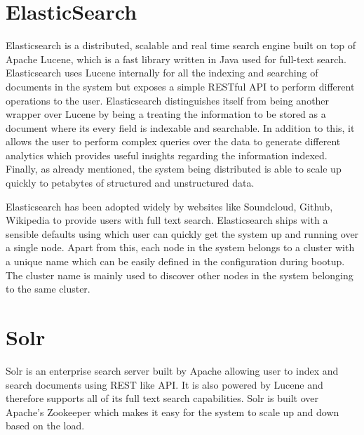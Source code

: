 \documentclass[12pt,a4paper,twoside,openright]{book}
\begin{document}
\section{ElasticSearch}

Elasticsearch \cite{elasticsearch} is a distributed, scalable and real time search engine built on top of Apache Lucene, which is a fast library written in Java used for full-text search. Elasticsearch uses Lucene internally for all the indexing and searching of documents in the system but exposes a simple RESTful API to perform different operations to the user. Elasticsearch distinguishes itself from being another wrapper over Lucene by being a treating the information to be stored as a document where its every field is indexable and searchable. In addition to this, it allows the user to perform complex queries over the data to generate different analytics which provides useful insights regarding the information indexed. Finally, as already mentioned, the system being distributed is able to scale up quickly to petabytes of structured and unstructured data.

\par Elasticsearch has been adopted widely by websites like Soundcloud, Github, Wikipedia to provide users with full text search. Elasticsearch ships with a sensible defaults using which user can quickly get the system up and running over a single node. Apart from this, each node in the system belongs to a cluster with a unique name which can be easily defined in the configuration during bootup. The cluster name is mainly used to discover other nodes in the system belonging to the same cluster.

\section{Solr}

Solr \cite{solr} is an enterprise search server built by Apache allowing user to index and search documents using REST like API. It is also powered by Lucene and therefore supports all of its full text search capabilities. Solr is built over Apache's Zookeeper which makes it easy for the system to scale up and down based on the load.




\end{document}
